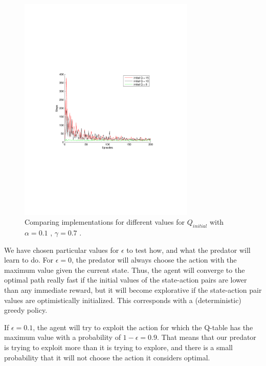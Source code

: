 \documentclass[a4paper,11pt]{article}
\begin{document}
\begin{figure}[t!]
  \centering
    \includegraphics[trim=4cm 8.5cm 4cm 8.5cm,clip,width=0.75\textwidth]{figures/qcomp.pdf}
    \caption{Comparing implementations for different values for $Q_{initial}$  with $\alpha = 0.1$ , $\gamma=0.7$ .}
    \label{qcomp}
\end{figure}



We have chosen particular values for $\epsilon$ to test how, and what the predator will learn to do. For $\epsilon = 0$, the predator will always choose the action with the maximum value given the current state. Thus, the agent will converge to the optimal path really fast if the initial values of the state-action pairs are lower than any immediate reward, but it will become explorative if the state-action pair values are optimistically initialized.  This corresponds with a (deterministic) greedy policy.


If $\epsilon = 0.1$, the agent will try to exploit the action for which the Q-table has the maximum value with a probability of $1-\epsilon = 0.9$. That means that our predator is trying to exploit more than it is trying to explore, and there is a small probability that it will not choose the action it considers optimal.
\end{document}
